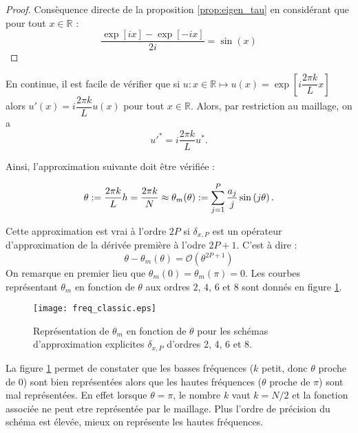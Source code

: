 \begin{proof}
Consèquence directe de la proposition \ref{prop:eigen_tau} en considérant que pour tout $x \in \mathbb{R}$ :
\begin{equation}
\dfrac{\exp \left[ i x \right] - \exp \left[ -i x \right]}{2 i} = \sin ( x ) 
\end{equation}
\end{proof}

En continue, il est facile de vérifier que si $u : x \in \mathbb{R} \mapsto u(x) = \exp \left[ i \dfrac{2 \pi k}{L} x \right]$ alors $u'(x) = i \dfrac{2 \pi k}{L} u(x)$ pour tout $x \in \mathbb{R}$. Alors, par restriction au maillage, on a
\begin{equation}
u'^* = i \dfrac{2 \pi k}{L} u^*.
\end{equation}

Ainsi, l'approximation suivante doit être vérifiée :

\begin{equation}
\theta := \dfrac{2 \pi k}{L} h = \dfrac{2 \pi k}{N} \approx \theta_m(\theta) := \displaystyle\sum\limits_{j=1}^P \dfrac{a_j}{j} \sin \left( j \theta \right).
\end{equation}

Cette approximation est vrai à l'ordre $2P$ si $\delta_{x,P}$ est un opérateur d'approximation de la dérivée première à l'odre $2P+1$. C'est à dire :
\begin{equation}
\theta - \theta_m(\theta) = \mathcal{O} \left( \theta^{2P+1} \right)
\end{equation}
On remarque en premier lieu que $\theta_m(0) = \theta_m ( \pi ) = 0$. Les courbes représentant $\theta_m$ en fonction de $\theta$ aux ordres $2$, $4$, $6$ et $8$ sont donnés en figure \ref{fig:freq_classic}. 

\begin{figure}[htbp]
\begin{center}
\texttt{[image: freq\_classic.eps]}
\end{center}
\caption{Représentation de $\theta_m$ en fonction de $\theta$ pour les schémas d'approximation explicites $\delta_{x,P}$ d'ordres 2, 4, 6 et 8.}
\label{fig:freq_classic}
\end{figure}

La figure \ref{fig:freq_classic} permet de constater que les basses fréquences ($k$ petit, donc $\theta$ proche de $0$) sont bien représentées alors que les hautes fréquences ($\theta$ proche de $\pi$) sont mal représentées. En effet lorsque $\theta = \pi$, le nombre $k$ vaut $k = N/2$ et la fonction associée ne peut etre représentée par le maillage. 
Plus l'ordre de précision du schéma est élevée, mieux on représente les hautes fréquences.



